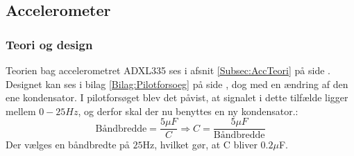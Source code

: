 \subsection{Accelerometer}\label{Acc_afsnit}
\subsubsection{Teori og design}
Teorien bag accelerometret ADXL335 ses i afsnit \ref{Subsec:AccTeori} på side \pageref{Subsec:AccTeori}. Designet kan ses i bilag \ref{Bilag:Pilotforsoeg} på side \pageref{Bilag:Pilotforsoeg}, dog med en ændring af den ene kondensator. I pilotforsøget blev det påvist, at signalet i dette tilfælde ligger mellem $0-25Hz$, og derfor skal der nu benyttes en ny kondensator.\cite{Devices2009}:
\begin{equation}
\text{Båndbredde} = \dfrac{5\mu F}{C} \Rightarrow  C = \dfrac{5\mu F}{\text{Båndbredde}}
\end{equation}
Der vælges en båndbredte på $25$Hz, hvilket gør, at C bliver $0.2\mu$F.  

